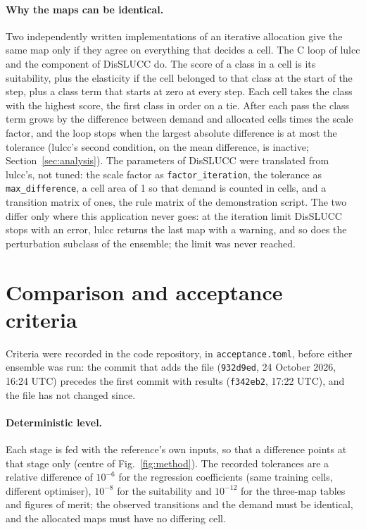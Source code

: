 \paragraph{Why the maps can be identical.} Two independently written implementations of
an iterative allocation give the same map only if they agree on everything that decides
a cell. The C loop of lulcc and the component of DisSLUCC do. The score of a class in a cell is its
suitability, plus the elasticity if the cell belonged to that class at the start of the
step, plus a class term that starts at zero at every step. Each cell takes the class with
the highest score, the first class in order on a tie. After each pass the class term
grows by the difference between demand and allocated cells times the scale factor, and
the loop stops when the largest absolute difference is at most the tolerance (lulcc's
second condition, on the mean difference, is inactive; Section~\ref{sec:analysis}). The
parameters of DisSLUCC were translated from lulcc's, not tuned: the scale factor as
\texttt{factor\_iteration}, the tolerance as \texttt{max\_difference}, a cell area of 1 so
that demand is counted in cells, and a transition matrix of ones, the rule matrix of the
demonstration script. The two differ only where this application never goes: at the
iteration limit DisSLUCC stops with an error, lulcc returns the last map with a warning,
and so does the perturbation subclass of the ensemble; the limit was never reached.

\section{Comparison and acceptance criteria}
\label{sec:comparison}

Criteria were recorded in the code repository, in \texttt{acceptance.toml}, before either
ensemble was run: the commit that adds the file (\texttt{932d9ed}, 24 October 2026, 16:24
UTC) precedes the first commit with results (\texttt{f342eb2}, 17:22 UTC), and the file
has not changed since.

\paragraph{Deterministic level.} Each stage is fed with the reference's own inputs, so
that a difference points at that stage only (centre of Fig.~\ref{fig:method}). The recorded tolerances are a relative difference of $10^{-6}$ for the regression
coefficients (same training cells, different optimiser), $10^{-8}$ for the suitability and
$10^{-12}$ for the three-map tables and figures of merit; the observed transitions and the
demand must be identical, and the allocated maps must have no differing cell.

